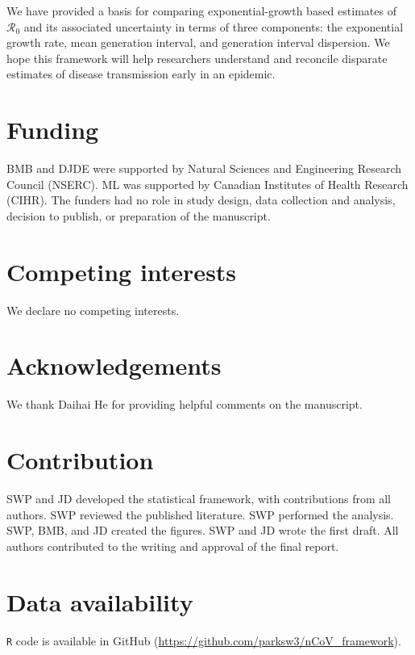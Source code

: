 \documentclass[12pt]{article}
\newcommand{\Ro}{\ensuremath{{\mathcal R}_{0}}\xspace}
\begin{document}
We have provided a basis for comparing exponential-growth based estimates of \Ro and its associated uncertainty in terms of three components: the exponential growth rate, mean generation interval, and generation interval dispersion. 
We hope this framework will help researchers understand and reconcile disparate estimates of disease transmission early in an epidemic.

\pagebreak

\section*{Funding}

BMB and DJDE were supported by Natural Sciences and Engineering Research Council (NSERC). ML was supported by Canadian Institutes of Health Research (CIHR). The funders had no role in study design, data collection and analysis, decision to publish, or preparation of the manuscript.

\section*{Competing interests}

We declare no competing interests.

\section*{Acknowledgements}

We thank Daihai He for providing helpful comments on the manuscript.

\section*{Contribution}

SWP and JD developed the statistical framework, with contributions from all authors. 
SWP reviewed the published literature.
SWP performed the analysis.
SWP, BMB, and JD created the figures. 
SWP and JD wrote the first draft.
All authors contributed to the writing and approval of the final report.

\section*{Data availability}

\texttt{R} code is available in GitHub (\url{https://github.com/parksw3/nCoV_framework}).


\pagebreak
\end{document}

